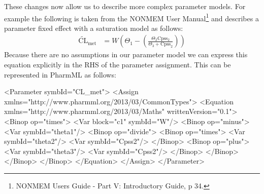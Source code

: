 \documentclass[a4paper,11pt]{article}
\newcommand{\pharmml}{PharmML\xspace}
\begin{document}
These changes now allow us to describe more complex parameter
models. For example the following is taken from the NONMEM User
Manual\footnote{NONMEM Users Guide - Part V: Introductory Guide, p 34.}
and describes a parameter fixed effect with a saturation model as follows:
%
\begin{align*}
\mathrm{\widetilde{CL}}_{\mathrm{met}} &= W \left(\Theta_1 - \left(\frac{\Theta_2 \mathrm{Cpss_2}}{\Theta_3 + \mathrm{Cpss}_2}\right)\right)
\end{align*}
%
Because there are no assumptions in our parameter model we can express
this equation explicitly in the RHS of the parameter assignment. This
can be represented in \pharmml as follows:
%
\begin{xmlcode}
<Parameter symbId="CL_met">
    <Assign xmlns="http://www.pharmml.org/2013/03/CommonTypes">
        <Equation xmlns="http://www.pharmml.org/2013/03/Maths"
          writtenVersion="0.1">
            <Binop op="times">
                <Var block="c1" symbId="W"/>
                <Binop op="minus">
                    <Var symbId="theta1"/>
                    <Binop op="divide">
                        <Binop op="times">
                            <Var symbId="theta2"/>
                            <Var symbId="Cpss2"/>
                        </Binop>
                        <Binop op="plus">
                            <Var symbId="theta3"/>
                            <Var symbId="Cpss2"/>
                        </Binop>
                    </Binop>
                </Binop>
            </Binop>
        </Equation>
    </Assign>
</Parameter>
\end{xmlcode}
\end{document}

